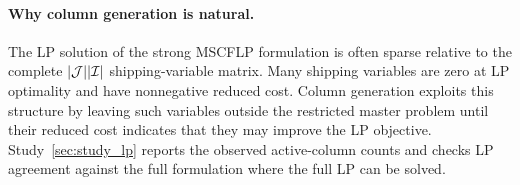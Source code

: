\paragraph{Why column generation is natural.}
The LP solution of the strong MSCFLP formulation is often sparse relative to the
complete $|\mathcal{J}||\mathcal{I}|$ shipping-variable matrix.
Many shipping variables are zero at LP optimality and have nonnegative reduced
cost.
Column generation exploits this structure by leaving such variables outside the
restricted master problem until their reduced cost indicates that they may
improve the LP objective.
Study~\ref{sec:study_lp} reports the observed active-column counts and checks
LP agreement against the full formulation where the full LP can be solved.

